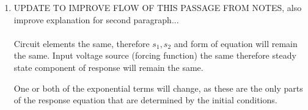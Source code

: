 \begin{enumerate}
	\item{
		UPDATE TO IMPROVE FLOW OF THIS PASSAGE FROM NOTES, also improve explanation for second paragraph...
		\\ \\
		Circuit elements the same, therefore $s_1, s_2$ and form of equation will remain the same. Input voltage source (forcing function) the same therefore steady state component of response will remain the same.
		\par
		One or both of the exponential terms will change, as these are the only parts of the response equation that are determined by the initial conditions.
		\\ \\
	}

\end{enumerate}
